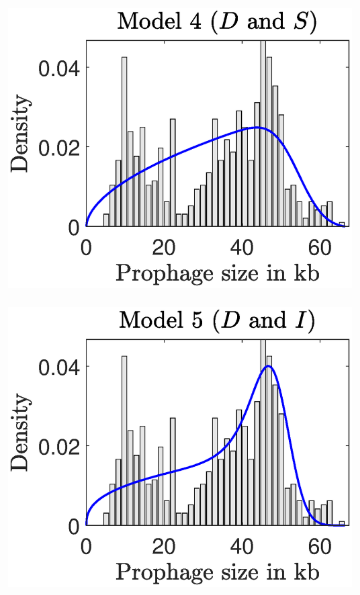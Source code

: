 \begin{figure}[H]
\centering
  \begin{subfigure}[t]{0.3\textwidth}
  \centering
 \includegraphics[scale=0.40]{DegSel.eps}
 \end{subfigure}\hfill
 \quad
 \begin{subfigure}[t]{0.3\textwidth}
 \centering
 \includegraphics[scale=0.40]{DegInd.eps}
 \label{fig:DegInd}
 \end{subfigure}\hfill

\end{figure}
